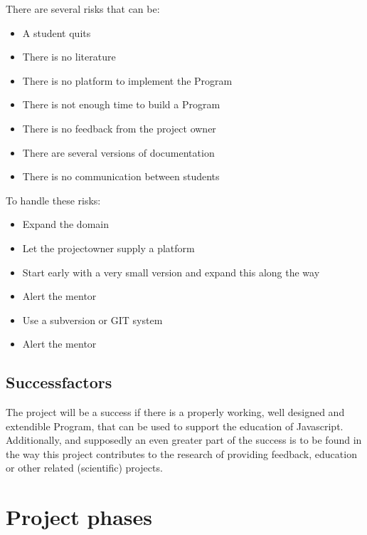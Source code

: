 \documentclass{article}
\begin{document}
There are several risks that can be:
\begin{itemize}
  \item A student quits
  \item There is no literature
  \item There is no platform to implement the Program
  \item There is not enough time to build a Program
  \item There is no feedback from the project owner
  \item There are several versions of documentation
  \item There is no communication between students
\end{itemize}

\noindent To handle these risks:
\begin{itemize}
  \item Expand the domain
  \item Let the projectowner supply a platform
  \item Start early with  a very small version and expand this along the way
  \item Alert the mentor
  \item Use a subversion or GIT system
  \item Alert the mentor
\end{itemize}

\subsection{Successfactors}

The project will be a success if there is a properly working, well designed and extendible Program, that can be used to support the education of Javascript. Additionally, and supposedly an even greater part of the success is to be found in the way this project contributes to the research of providing feedback, education or other related (scientific) projects.

\section{Project phases}

\end{document}
